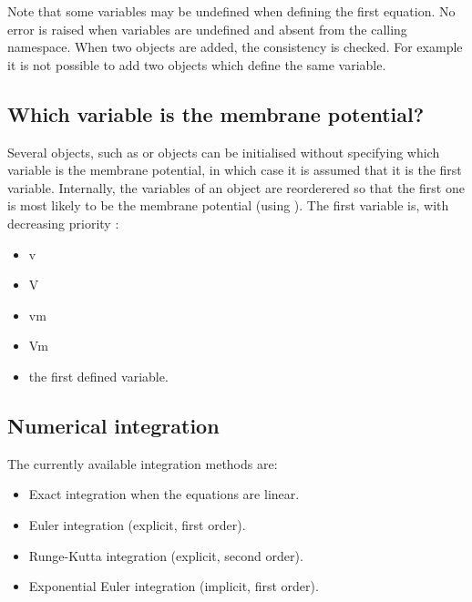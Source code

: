 \documentclass[letterpaper,10pt,english]{manual}
\begin{document}
Note that some variables may be undefined when defining the first equation. No error is
raised when variables are undefined and absent from the calling namespace.
When two \hyperlink{brian.Equations}{} objects are added, the consistency is checked. For example it is not
possible to add two \hyperlink{brian.Equations}{} objects which define the same variable.

\subsection{Which variable is the membrane potential?}

Several objects, such as \hyperlink{brian.Threshold}{} or \hyperlink{brian.Reset}{} objects
can be initialised without specifying which variable is the membrane potential, in which
case it is assumed that it is the first variable.
Internally, the variables of an \hyperlink{brian.Equations}{} object are reorderered so that the first one
is most likely to be the membrane potential (using ).
The first variable is, with decreasing priority :
\begin{itemize}
\item {} 
v

\item {} 
V

\item {} 
vm

\item {} 
Vm

\item {} 
the first defined variable.

\end{itemize}
\hypertarget{numerical-integration}{}

\subsection{Numerical integration}

The currently available integration methods are:
\begin{itemize}
\item {} 
Exact integration when the equations are linear.

\item {} 
Euler integration (explicit, first order).

\item {} 
Runge-Kutta integration (explicit, second order).

\item {} 
Exponential Euler integration (implicit, first order).

\end{itemize}
\end{document}
